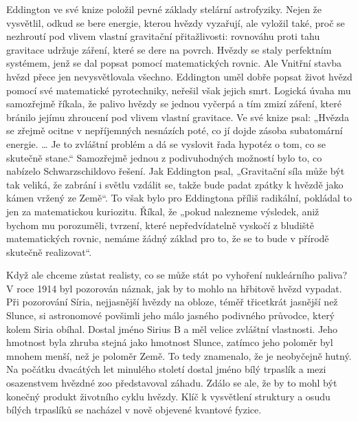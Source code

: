   Eddington ve své knize položil pevné základy stelární astrofyziky. Nejen že vysvětlil, odkud se
  bere energie, kterou hvězdy vyzařují, ale vyložil také, proč se nezhroutí pod vlivem vlastní
  gravitační přitažlivosti: rovnováhu proti tahu gravitace udržuje záření, které se dere na povrch.
  Hvězdy se staly perfektním systémem, jenž se dal popsat pomocí matematických rovnic. Ale Vnitřní
  stavba hvězd přece jen nevysvětlovala všechno. Eddington uměl dobře popsat život hvězd pomocí své
  matematické pyrotechniky, neřešil však jejich smrt. Logická úvaha mu samozřejmě říkala, že palivo
  hvězdy se jednou vyčerpá a tím zmizí záření, které bránilo jejímu zhroucení pod vlivem vlastní
  gravitace. Ve své knize psal: „Hvězda se zřejmě ocitne v nepříjemných nesnázích poté, co jí dojde
  zásoba subatomární energie. … Je to zvláštní problém a dá se vyslovit řada hypotéz o tom, co se
  skutečně stane.“ Samozřejmě jednou z podivuhodných možností bylo to, co nabízelo Schwarzschildovo
  řešení. Jak Eddington psal, „Gravitační síla může být tak veliká, že zabrání i světlu vzdálit se,
  takže bude padat zpátky k hvězdě jako kámen vržený ze Země“. To však bylo pro Eddingtona příliš
  radikální, pokládal to jen za matematickou kuriozitu. Říkal, že „pokud nalezneme výsledek, aniž
  bychom mu porozuměli, tvrzení, které nepředvídatelně vyskočí z bludiště matematických rovnic,
  nemáme žádný základ pro to, že se to bude v přírodě skutečně realizovat“.
  
  Když ale chceme zůstat realisty, co se může stát po vyhoření nukleárního paliva? V roce 1914 byl
  pozorován náznak, jak by to mohlo na hřbitově hvězd vypadat. Při pozorování Síria, nejjasnější
  hvězdy na obloze, téměř třicetkrát jasnější než Slunce, si astronomové povšimli jeho málo jasného
  podivného průvodce, který kolem Siria obíhal. Dostal jméno Sirius B a měl velice zvláštní
  vlastnosti. Jeho hmotnost byla zhruba stejná jako hmotnost Slunce, zatímco jeho poloměr byl mnohem
  menší, než je poloměr Země. To tedy znamenalo, že je neobyčejně hutný. Na počátku dvacátých let
  minulého století dostal jméno bílý trpaslík a mezi osazenstvem hvězdné zoo představoval záhadu.
  Zdálo se ale, že by to mohl být konečný produkt životního cyklu hvězdy. Klíč k vysvětlení
  struktury a osudu bílých trpaslíků se nacházel v nově objevené kvantové fyzice. 
  
